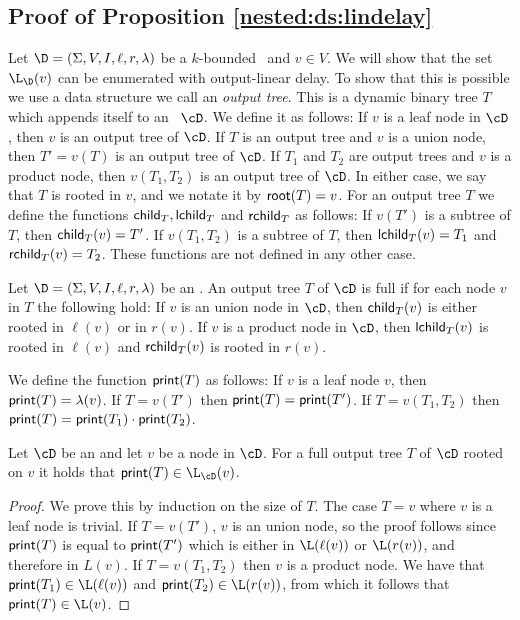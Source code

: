 
\subsection{Proof of Proposition \ref{nested:ds:lindelay}}

Let $\D = (\Sigma, V, I, \ell, r, \lambda)$ be a $k$-bounded \dsabbr\ and $v\in V$. We will show that the set $\L_{\D}(v)$ can be enumerated with output-linear delay. To show that this is possible we use a data structure we call an {\em output tree}. This is a dynamic binary tree $T$ which appends itself to an \dsabbr \ $\cD$. We define it as follows: If $v$ is a leaf node in $\cD$, then $v$ is an output tree of $\cD$. If $T$ is an output tree and $v$ is a union node, then $T' = v(T)$ is an output tree of $\cD$. If $T_1$ and $T_2$ are output trees and $v$ is a product node, then $v(T_1,T_2)$ is an output tree of $\cD$. In either case, we say that $T$ is rooted in $v$, and we notate it by ${\sf root}(T) = v$. For an output tree $T$ we define the functions ${\sf child}_T, {\sf lchild}_T$ and ${\sf rchild}_T$ as follows: If $v(T')$ is a subtree of $T$, then ${\sf child}_T(v) = T'$. If $v(T_1,T_2)$ is a subtree of $T$, then ${\sf lchild}_T(v) = T_1$ and ${\sf rchild}_T(v) = T_2$. These functions are not defined in any other case.

\begin{definition}
	Let $\D = (\Sigma, V, I, \ell, r, \lambda)$ be an \dsabbr. An output tree $T$ of $\cD$ is full if for each node $v$ in $T$ the following hold: If $v$ is an union node in $\cD$, then ${\sf child}_T(v)$ is either rooted in $\ell(v)$ or in $r(v)$. If $v$ is a product node in $\cD$, then ${\sf lchild}_T(v)$ is rooted in $\ell(v)$ and ${\sf rchild}_T(v)$ is rooted in $r(v)$.
\end{definition}

We define the function ${\sf print}(T)$ as follows: If $v$ is a leaf node $v$, then ${\sf print}(T) = \lambda(v)$. If $T = v(T')$ then ${\sf print}(T) = {\sf print}(T')$. If $T = v(T_1, T_2)$ then ${\sf print}(T) = {\sf print}(T_1)\cdot {\sf print}(T_2)$.

\begin{lemma}\label{nested:appendix:output-tree-print}
	Let $\cD$ be an \dsabbr and let $v$ be a node in $\cD$. For a full output tree $T$ of $\cD$ rooted on $v$ it holds that ${\sf print}(T) \in \L_{\cD}(v)$.
\end{lemma}
\begin{proof}
	We prove this by induction on the size of $T$. The case $T = v$ where $v$ is a leaf node is trivial. If $T = v(T')$, $v$ is an union node, so the proof follows since ${\sf print}(T)$ is equal to ${\sf print}(T')$ which is either in $\L(\ell(v))$ or $\L(r(v))$, and therefore in $L(v)$. If $T = v(T_1,T_2)$ then $v$ is a product node. We have that ${\sf print}(T_1)\in\L(\ell(v))$ and ${\sf print}(T_2)\in\L(r(v))$, from which it follows that ${\sf print}(T)\in\L(v)$.
\end{proof}


